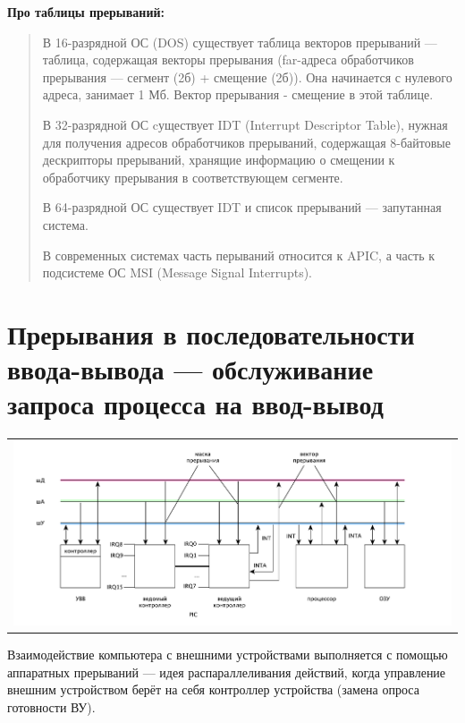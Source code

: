\textbf{Про таблицы прерываний:}

\begin{quote}	
	В 16-разрядной ОС (DOS) существует таблица векторов прерываний --- таблица, содержащая векторы прерывания (far-адреса обработчиков прерывания --- сегмент (2б) + смещение (2б)). Она начинается с нулевого адреса, занимает 1 Мб. Вектор прерывания - смещение в этой таблице.
	
	В 32-разрядной ОС cуществует IDT (Interrupt Descriptor Table), нужная для получения адресов обработчиков прерываний, содержащая 8-байтовые дескрипторы прерываний, хранящие информацию о смещении к обработчику прерывания в соответствующем сегменте.
	
	В 64-разрядной ОС существует IDT и список прерываний --- запутанная система.
	
	В современных системах часть перываний относится к APIC, а часть к подсистеме ОС MSI (Message Signal Interrupts).
\end{quote}

\newpage

\section{Прерывания в последовательности ввода-вывода --- обслуживание запроса процесса на ввод-вывод}

\begin{table}[h!]
  \centering
  \begin{tabular}{p{1\linewidth}}
    \centering
    \includegraphics[width=0.9\linewidth]{./images/buses.pdf}
  \end{tabular}
\end{table}

Взаимодействие компьютера с внешними устройствами выполняется с помощью аппаратных прерываний --- идея распараллеливания действий, когда управление внешним устройством берёт на себя контроллер устройства (замена опроса готовности ВУ).


